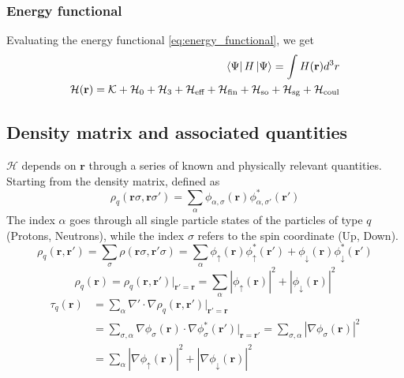 \subsubsection{Energy functional}
Evaluating the energy functional \ref{eq:energy_functional}, we get
\begin{align}
    \bra{\Psi} H \ket{\Psi} = \int H(\mathbf{r}) d^3 r 
    \\\mathcal H(\mathbf{r}) = \mathcal{K} + \mathcal{H}_0 + \mathcal{H}_3 + \mathcal{H}_\text{eff}+\mathcal{H}_\text{fin}+\mathcal{H}_\text{so} + \mathcal{H}_\text{sg} + \mathcal{H}_\text{coul}
\end{align}
\subsection{Density matrix and associated quantities}
$\mathcal H$ depends on $\mathbf r$ through a series of known and physically relevant quantities.
\\Starting from the density matrix, defined as
\begin{equation}
    \rho_q (\mathbf r \sigma, \mathbf r \sigma') = \sum_{\alpha} \phi_{\alpha, \sigma} (\mathbf r )\phi_{\alpha, \sigma'}^*(\mathbf r')
\end{equation}
The index $\alpha$ goes through all single particle states of the particles of type $q$ (Protons, Neutrons), while the index $\sigma$ refers to the spin coordinate (Up, Down). 
\begin{equation}
    \rho_q(\mathbf r, \mathbf r') = \sum_{\sigma}\rho(\mathbf r\sigma, \mathbf r'\sigma) =\sum_{\alpha} \phi_{\uparrow}(\mathbf r)\phi_{\uparrow}^*(\mathbf r')+\phi_{\downarrow}(\mathbf r)\phi_{\downarrow}^*(\mathbf r')
\end{equation}
\begin{equation}
\rho_q(\mathbf r) = \rho_q(\mathbf r, \mathbf r')\bigg|_{\mathbf r'=\mathbf r} =\sum_{\alpha} |\phi_{\uparrow}(\mathbf r)|^2+|\phi_{\downarrow}(\mathbf r)|^2
\end{equation}
\begin{align}
    \tau_q(\mathbf r) &= \sum_{\alpha} \nabla'\cdot\nabla\rho_q(\mathbf r, \mathbf r')\bigg|_{\mathbf r'=\mathbf r} 
    \\&= \sum_{\sigma, \alpha} \nabla \phi_\sigma (\mathbf r)\cdot \nabla \phi_\sigma^*(\mathbf r')\bigg|_{\mathbf r = \mathbf r'} = \sum_{\sigma, \alpha} |\nabla \phi_\sigma(\mathbf r)|^2 
    \\&= \sum_{\alpha}|\nabla \phi_\uparrow(\mathbf r)|^2 + |\nabla \phi_\downarrow(\mathbf r)|^2
\end{align}
